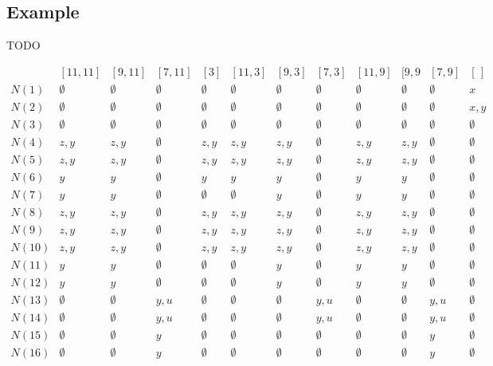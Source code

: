 \documentclass[a4wide,12pt]{article}
\theoremstyle{definition}
\theoremstyle{plain}
\theoremstyle{remark}
\begin{document}
\subsection{Example}
TODO

\begin{table}
$
\begin{array}{lllllllllllllllllllllllllllllllllllll}
\  & [11, 11] & [9, 11] & [7, 11] & [3] & [11, 3] & [9, 3] & [7, 3] & [11, 9] & [9, 9 & [7, 9] & [\,] \\
N(1)  & \emptyset & \emptyset & \emptyset & \emptyset & \emptyset & \emptyset & \emptyset & \emptyset & \emptyset & \emptyset & x  \\
N(2)  & \emptyset & \emptyset & \emptyset & \emptyset & \emptyset & \emptyset & \emptyset & \emptyset & \emptyset & \emptyset & x, y \\
N(3)  & \emptyset & \emptyset & \emptyset & \emptyset & \emptyset & \emptyset & \emptyset & \emptyset & \emptyset & \emptyset & \emptyset \\
N(4)  & z, y   & z, y   & \emptyset & z, y   & z, y   & z, y   & \emptyset & z, y   & z, y   & \emptyset & \emptyset \\
N(5)  & z, y   & z, y   & \emptyset & z, y   & z, y   & z, y   & \emptyset & z, y   & z, y   & \emptyset & \emptyset \\ 
N(6)  &    y   &    y   & \emptyset &    y   &    y   &    y   & \emptyset &    y   & y      & \emptyset & \emptyset \\
N(7)  &    y   &    y   & \emptyset & \emptyset & \emptyset &    y   & \emptyset &    y   & y      & \emptyset & \emptyset \\
N(8)  & z, y   & z, y   & \emptyset & z, y   & z, y   & z, y   & \emptyset & z, y   & z, y   & \emptyset & \emptyset \\
N(9)  & z, y   & z, y   & \emptyset & z, y   & z, y   & z, y   & \emptyset & z, y   & z, y   & \emptyset & \emptyset \\
N(10) & z, y   & z, y   & \emptyset & z, y   & z, y   & z, y   & \emptyset & z, y   & z, y   & \emptyset & \emptyset \\
N(11) &    y   &    y   & \emptyset & \emptyset & \emptyset &    y   & \emptyset &    y   & y      & \emptyset & \emptyset \\
N(12) &    y   &    y   & \emptyset & \emptyset & \emptyset &    y   & \emptyset &    y   & y      & \emptyset & \emptyset \\
N(13) & \emptyset & \emptyset & y, u   & \emptyset & \emptyset & \emptyset & y, u   & \emptyset & \emptyset & y, u   & \emptyset \\
N(14) & \emptyset & \emptyset & y, u   & \emptyset & \emptyset & \emptyset & y, u   & \emptyset & \emptyset & y, u   & \emptyset \\
N(15) & \emptyset & \emptyset & y      & \emptyset & \emptyset & \emptyset & \emptyset & \emptyset & \emptyset & y      & \emptyset \\
N(16) & \emptyset & \emptyset & y      & \emptyset & \emptyset & \emptyset & \emptyset & \emptyset & \emptyset & y      & \emptyset
\end{array}
$
\end{table}
\end{document}
